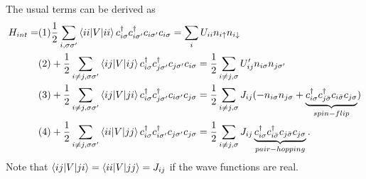\documentclass[12pt,a4paper]{scrartcl}
\numberwithin{equation}{section}
\begin{document}
The usual terms can be derived as
\begin{align}
 H_{int}
 = &(1) \frac{1}{2}\sum_{i,\sigma\sigma'} \braket{ii|V|ii} c^{\dagger}_{i\sigma} c^{\dagger}_{i\sigma'} c_{i\sigma'} c_{i\sigma}
  = \sum_{i} U_{ii} n_{i\uparrow} n_{i\downarrow} \\
%  
&(2) + \frac{1}{2}\sum_{i\neq j,\sigma\sigma'} \braket{ij|V|ij} c^{\dagger}_{i\sigma} c^{\dagger}_{j\sigma'} c_{j\sigma'} c_{i\sigma}
  = \frac{1}{2}\sum_{i\neq j,\sigma} U'_{ij} n_{i\sigma} n_{j\sigma'} \\
%  
&(3) + \frac{1}{2}\sum_{i\neq j,\sigma\sigma'} \braket{ij|V|ji} c^{\dagger}_{i\sigma} c^{\dagger}_{j\sigma'} c_{i\sigma'} c_{j\sigma}
  = \frac{1}{2}\sum_{i\neq j,\sigma} J_{ij} (-n_{i\sigma} n_{j\sigma}  + \underbrace{ c^{\dagger}_{i\sigma} c^{\dagger}_{j\bar{\sigma}} c_{i\bar{\sigma}} c_{j\sigma} }_{spin-flip} )  \\
%  
&(4) + \frac{1}{2}\sum_{i\neq j,\sigma\sigma'} \braket{ii|V|jj} c^{\dagger}_{i\sigma} c^{\dagger}_{i\sigma'} c_{j\sigma'} c_{j\sigma}
  = \frac{1}{2}\sum_{i\neq j,\sigma} J_{ij}   \underbrace{ c^{\dagger}_{i\sigma} c^{\dagger}_{i\bar{\sigma}} c_{j\bar{\sigma}} c_{j\sigma} }_{pair-hopping}. 
\end{align}
Note that $\braket{ij|V|ji} = \braket{ii|V|jj} = J_{ij}$ if the wave functions are real.
\end{document}

